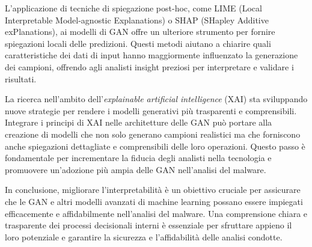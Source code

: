 L'applicazione di tecniche di spiegazione post-hoc, come LIME (Local Interpretable Model-agnostic Explanations) o SHAP (SHapley Additive exPlanations), ai modelli di GAN offre un ulteriore strumento per fornire spiegazioni locali delle predizioni. Questi metodi aiutano a chiarire quali caratteristiche dei dati di input hanno maggiormente influenzato la generazione dei campioni, offrendo agli analisti insight preziosi per interpretare e validare i risultati.

La ricerca nell'ambito dell'\emph{explainable artificial intelligence} (XAI) sta sviluppando nuove strategie per rendere i modelli generativi più trasparenti e comprensibili. Integrare i principi di XAI nelle architetture delle GAN può portare alla creazione di modelli che non solo generano campioni realistici ma che forniscono anche spiegazioni dettagliate e comprensibili delle loro operazioni. Questo passo è fondamentale per incrementare la fiducia degli analisti nella tecnologia e promuovere un'adozione più ampia delle GAN nell'analisi del malware.

In conclusione, migliorare l'interpretabilità è un obiettivo cruciale per assicurare che le GAN e altri modelli avanzati di machine learning possano essere impiegati efficacemente e affidabilmente nell'analisi del malware. Una comprensione chiara e trasparente dei processi decisionali interni è essenziale per sfruttare appieno il loro potenziale e garantire la sicurezza e l'affidabilità delle analisi condotte.


